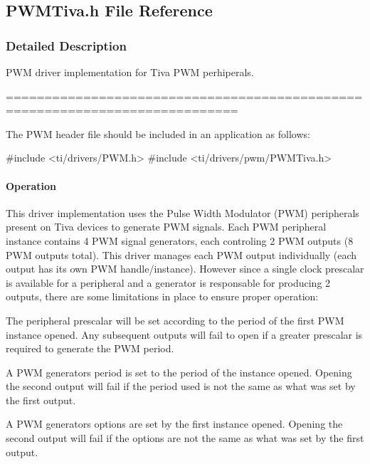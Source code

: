 \subsection{P\+W\+M\+Tiva.\+h File Reference}
\label{_p_w_m_tiva_8h}


\subsubsection{Detailed Description}
P\+W\+M driver implementation for Tiva P\+W\+M perhiperals. 

============================================================================

The P\+W\+M header file should be included in an application as follows\+: 
\begin{DoxyCode}
\textcolor{preprocessor}{#include <ti/drivers/PWM.h>}
\textcolor{preprocessor}{#include <ti/drivers/pwm/PWMTiva.h>}
\end{DoxyCode}


\paragraph*{Operation}

This driver implementation uses the Pulse Width Modulator (P\+W\+M) peripherals present on Tiva devices to generate P\+W\+M signals. Each P\+W\+M peripheral instance contains 4 P\+W\+M signal generators, each controling 2 P\+W\+M outputs (8 P\+W\+M outputs total). This driver manages each P\+W\+M output individually (each output has it\textquotesingle{}s own P\+W\+M handle/instance). However since a single clock prescalar is available for a peripheral and a generator is responsable for producing 2 outputs, there are some limitations in place to ensure proper operation\+:
\begin{DoxyEnumerate}
\item The peripheral prescalar will be set according to the period of the first P\+W\+M instance opened. Any subsequent outputs will fail to open if a greater prescalar is required to generate the P\+W\+M period.
\item A P\+W\+M generators period is set to the period of the instance opened. Opening the second output will fail if the period used is not the same as what was set by the first output.
\item A P\+W\+M generators options are set by the first instance opened. Opening the second output will fail if the options are not the same as what was set by the first output.
\end{DoxyEnumerate}

